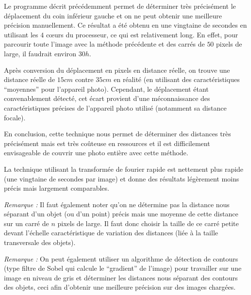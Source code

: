 \documentclass[10pt,a4paper]{article}
\begin{document}
		Le programme décrit précédemment permet de déterminer très précisément le déplacement du coin inférieur gauche et on ne peut obtenir une meilleure précision manuellement. Ce résultat a été obtenu en une vingtaine de secondes en utilisant les $4$ c{\oe}urs du processeur, ce qui est relativement long. En effet, pour parcourir toute l'image avec la méthode précédente et des carrés de $50$ pixels de large, il faudrait environ $30h$.
		
		Après conversion du déplacement en pixels en distance réelle, on trouve une distance réelle de $15cm$ contre $35cm$ en réalité (en utilisant des caractéristiques ``moyennes'' pour l'appareil photo). Cependant, le déplacement étant convenablement détecté, cet écart provient d'une méconnaissance des caractéristiques précises de l'appareil photo utilisé (notamment sa distance focale).
		
		En conclusion, cette technique nous permet de déterminer des distances très précisément mais est très coûteuse en ressources et il est difficilement envisageable de couvrir une photo entière avec cette méthode.
		
		La technique utilisant la transformée de fourier rapide est nettement plus rapide (une vingtaine de secondes par image) et donne des résultats légèrement moins précis mais largement comparables.
		
		\medskip
		\emph{Remarque :} Il faut également noter qu'on ne détermine pas la distance nous séparant d'un objet (ou d'un point) précis mais une moyenne de cette distance sur un carré de $n$ pixels de large. Il faut donc choisir la taille de ce carré petite devant l'échelle caractéristique de variation des distances (liée à la taille transversale des objets).
		
		\emph{Remarque :} On peut également utiliser un algorithme de détection de contours (type filtre de Sobel qui calcule le ``gradient'' de l'image) pour travailler sur une image en niveau de gris et déterminer les distances nous séparant des contours des objets, ceci afin d'obtenir une meilleure précision sur des images chargées.
	
\end{document}
